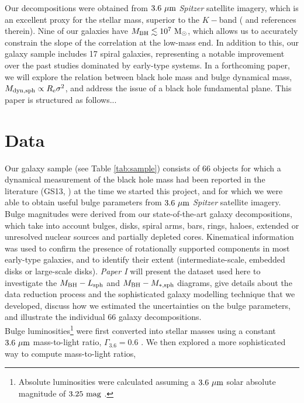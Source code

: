 \documentclass[preprint2]{emulateapj}
\begin{document}
Our decompositions were obtained from $3.6\rm~\mu m$ \emph{Spitzer} satellite imagery, 
which is an excellent proxy for the stellar mass, superior to the $K-$band (\citealt{sheth2010} and references therein).
Nine of our galaxies have $M_{\rm BH} \lesssim 10^7\rm~M_\odot$, 
which allows us to accurately constrain the slope of the correlation at the low-mass end.
In addition to this, our galaxy sample includes 17 spiral galaxies, 
representing a notable improvement over the past studies dominated by early-type systems. 
In a forthcoming paper, we will explore the relation between black hole mass and bulge dynamical mass, 
$M_{\rm dyn,sph} \propto R_{\rm e} \sigma^2$, and address the issue of a black hole fundamental plane.
This paper is structured as follows... 

\section{Data}
\label{sec:data}
Our galaxy sample (see Table \ref{tab:sample}) 
consists of 66 objects for which a dynamical measurement of the black hole mass had been reported in the literature 
(GS13, \citealt{rusli2013bhmassesDM}) at the time we started this project, 
and for which we were able to obtain useful bulge parameters from $3.6\rm~\mu m$ \emph{Spitzer} satellite imagery. 
Bulge magnitudes were derived from our state-of-the-art galaxy decompositions, which take into account 
bulges, disks, spiral arms, bars, rings, haloes, extended or unresolved nuclear sources and partially depleted cores.
Kinematical information \citep{atlas3dIII-MNRAS,scott2014,arnold2014} was used 
to confirm the presence of rotationally supported components in most early-type galaxies, 
and to identify their extent (intermediate-scale, embedded disks or large-scale disks). 
\emph{Paper I} will present the dataset used here to investigate the $M_{\rm BH} - L_{\rm sph}$ and $M_{\rm BH} - M_{\rm *,sph}$ diagrams, 
give details about the data reduction process and the sophisticated galaxy modelling technique that we developed, 
discuss how we estimated the uncertainties on the bulge parameters, 
and illustrate the individual 66 galaxy decompositions. \\
Bulge luminosities\footnote{Absolute luminosities were calculated 
assuming a $3.6\rm~\mu m$ solar absolute magnitude of $3.25\rm~mag$ \citep{sani2011}.} 
were first converted into stellar masses using a constant $3.6\rm~\mu m$ mass-to-light ratio, $\Gamma_{3.6} = 0.6$ \citep{meidt2014}.
We then explored a more sophisticated way to compute mass-to-light ratios, 
\end{document}
